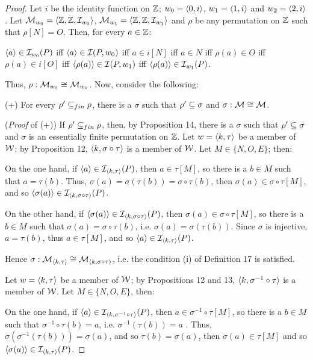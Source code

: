 \begin{proof}
\qquad Let $i$ be the identity function on $\mathbb{Z}$; $w_0 = \langle 0,i \rangle$, $w_1 = \langle1,i\rangle$ and $w_2 = \langle2,i\rangle$. Let $\mathcal{M}_{w_0} = \langle \mathbb{Z}, \mathbb{Z}, \mathcal{I}_{w_0} \rangle$, $\mathcal{M}_{w_1} = \langle \mathbb{Z}, \mathbb{Z}, \mathcal{I}_{w_1} \rangle$ and $\rho$ be any permutation on $\mathbb{Z}$ such that $\rho[N]=O$. Then, for every $a \in \mathbb{Z}$:

\begin{center}
$\langle a\rangle  \in  \mathcal{I}_{w_0}(P)$ iff $\langle a \rangle \in \mathcal{I}(P, w_{0})$ iff $a \in i[N]$ iff $a \in N$ iff $\rho(a) \in O$ iff $\rho(a) \in i[O]$ iff $ \langle \rho(a) \rangle \in \mathcal{I}(P,w_{1})$ iff $\langle \rho(a) \rangle \in  \mathcal{I}_{w_1}(P)$.
\end{center}

\qquad Thus, $\rho: \mathcal{M}_{w_0} \cong \mathcal{M}_{w_1}$. Now, consider the following:

\begin{center}
(+) For every $\rho^{\prime} \subseteq_{fin}\rho$, there is a $\sigma$ such that $\rho^{\prime} \subseteq \sigma$ and $\sigma: \mathcal{M} \cong \mathcal{M}$.
\end{center}

\qquad (\textit{Proof} of (+)) If $\rho^{\prime} \subseteq_{fin}\rho$, then, by Proposition 14, there is a $\sigma$ such that $\rho^{\prime} \subseteq \sigma$ and $\sigma$ is an essentially finite permutation on $\mathbb{Z}$. Let $w =\langle k,\tau \rangle$ be a member of $\mathcal{W}$; by Proposition 12, $\langle k,\sigma \circ \tau \rangle$ is a member of $\mathcal{W}$. Let $M \in \{N,O,E\}$; then:

\qquad On the one hand, if $\langle a \rangle \in \mathcal{I}_{\langle k,\tau \rangle}(P)$, then $a \in \tau[M]$, so there is a $b \in M$ such that $a = \tau(b)$. Thus, $\sigma(a) = \sigma(\tau(b)) = \sigma \circ\tau(b)$, then $\sigma(a) \in \sigma \circ\tau[M]$, and so $\langle \sigma(a) \rangle \in \mathcal{I}_{\langle k,\sigma \circ\tau \rangle}(P)$.

\qquad On the other hand, if $\langle \sigma(a) \rangle \in \mathcal{I}_{\langle k,\sigma \circ\tau \rangle}(P)$, then $\sigma(a) \in \sigma \circ\tau[M]$, so there is a $b \in M$ such that $\sigma(a) = \sigma \circ\tau(b)$, i.e. $\sigma(a) = \sigma(\tau(b))$. Since $\sigma$ is injective, $a = \tau(b)$, thus $a \in \tau[M]$, and so $\langle a \rangle \in \mathcal{I}_{\langle k,\tau \rangle}(P)$.

\qquad Hence $\sigma: \mathcal{M}_{\langle k,\tau \rangle} \cong \mathcal{M}_{\langle k,\sigma \circ \tau)}$, i.e. the condition (i) of Definition 17 is satisfied.

\qquad Let $w =\langle k,\tau \rangle$ be a member of $\mathcal{W}$; by Propositions 12 and 13, $\langle k,\sigma^{-1} \circ \tau \rangle$ is a member of $\mathcal{W}$. Let $M \in \{N,O,E\}$, then:


\qquad On the one hand, if $\langle a \rangle \in \mathcal{I}_{\langle k,\sigma^{-1} \circ \tau \rangle}(P)$, then $a \in \sigma^{-1} \circ \tau[M]$, so there is a $b \in M$ such that $\sigma^{-1} \circ \tau(b) =a$, i.e. $\sigma^{-1}(\tau(b)) =a$ . Thus,  $\sigma(\sigma^{-1}(\tau(b))) =\sigma(a)$, and so $\tau(b) =\sigma(a)$, then $\sigma(a) \in \tau[M]$ and so $\langle \sigma(a) \rangle \in \mathcal{I}_{\langle k,\tau\rangle}(P)$. 


\end{proof}
